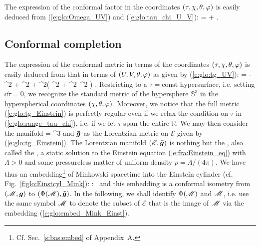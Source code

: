 The expression of the conformal factor in the
coordinates $(\tau,\chi,\theta,\varphi)$ is easily deduced from
(\ref{e:glo:Omega_UV}) and
(\ref{e:glo:tau_chi_U_V}):
\be \label{e:glo:Omega_tau_chi}
    \Omega = \cos\tau + \cos\chi .
\ee


\subsection{Conformal completion} \label{s:glo:conf_complet_Mink}

The expression of the conformal metric in terms of the coordinates
$(\tau,\chi,\theta,\varphi)$ is easily deduced from that in terms of
$(U,V,\theta,\varphi)$ as given by (\ref{e:glo:tg_UV}):
\be \label{e:glo:tg_Einstein}
     =  - \dd\tau^2
        + \dd \chi^2
        + \sin^2\chi \left(  \dd\th^2 + \sin^2\th \, \dd\ph^2 \right) .
\ee
Restricting to a $\tau = \mathrm{const}$ hypersurface, i.e. setting $\dd\tau=0$,
we recognize the standard metric of the hypersphere
$\mathbb{S}^3$ in the hyperspherical coordinates $(\chi,\theta,\varphi)$.
Moreover, we notice that the full metric (\ref{e:glo:tg_Einstein})
is perfectly regular even if we relax
the condition on $\tau$ in (\ref{e:glo:range_tau_chi}), i.e. if we
let $\tau$ span the
entire $\mathbb{R}$. We may then consider the manifold
\be
     = \times {}^3
\ee
and $\bm{\tilde{g}}$ as the Lorentzian metric on $\mathscr{E}$ given by
(\ref{e:glo:tg_Einstein}).
The Lorentzian manifold
$(\mathscr{E},\bm{\tilde{g}})$ is nothing but the
, also called the ,
a static solution to the Einstein equation (\ref{e:fra:Einstein_eq})
with $\Lambda > 0$ and some pressureless matter of uniform density
$\rho = \Lambda/(4\pi)$.
We have thus an embedding\footnote{Cf. Sec.~\ref{s:bas:embed} of Appendix~A.} of Minkowski spacetime into the Einstein cylinder (cf. Fig.~\ref{f:glo:Einstcyl_Mink}):
\be \label{e:glo:embed_Mink_Einst}
     \Phi:\ \M \longrightarrow {}
\ee
and this embedding is a conformal isometry from
$(\mathscr{M},\bm{g})$ to $(\Phi(\mathscr{M}),\bm{\tilde{g}})$.
In the following, we shall identify $\Phi(\mathscr{M})$ and $\mathscr{M}$, i.e. use the same
symbol $\mathscr{M}$ to denote the subset of $\mathscr{E}$ that is the image of $\mathscr{M}$ via the
embedding (\ref{e:glo:embed_Mink_Einst}).

